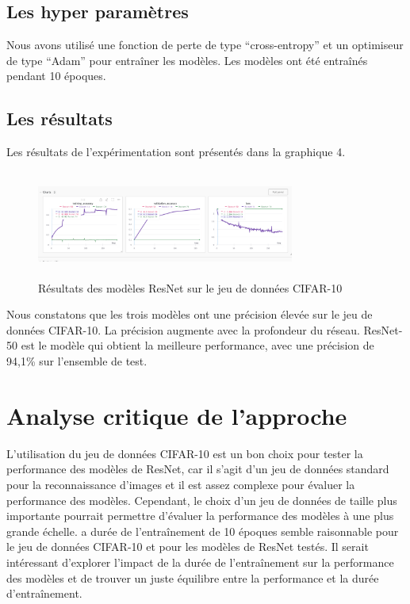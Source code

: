 \documentclass{article}
\begin{document}
\subsection{Les hyper paramètres}

Nous avons utilisé une fonction de perte de type ``cross-entropy'' et un optimiseur de type ``Adam'' pour entraîner les modèles.
Les modèles ont été entraînés pendant 10 époques.

\subsection{Les résultats}

Les résultats de l'expérimentation sont présentés dans la graphique 4.

\begin{figure}[h]
    \centering
    \includegraphics[width=240pt,height=100pt]{./img/result}
    \caption{Résultats des modèles ResNet sur le jeu de données CIFAR-10}\label{fig:result}
\end{figure}

Nous constatons que les trois modèles ont une précision élevée sur le jeu de données CIFAR-10.
La précision augmente avec la profondeur du réseau. ResNet-50 est le modèle qui obtient la meilleure performance,
avec une précision de 94,1\% sur l'ensemble de test.

\section{Analyse critique de l'approche}

L'utilisation du jeu de données CIFAR-10 est un bon choix pour tester la performance des modèles de ResNet,
car il s'agit d'un jeu de données standard pour la reconnaissance d'images et il est assez complexe pour évaluer
la performance des modèles.
Cependant, le choix d'un jeu de données de taille plus importante pourrait permettre d'évaluer la performance
des modèles à une plus grande échelle.
a durée de l'entraînement de 10 époques semble raisonnable pour le jeu de données CIFAR-10 et pour les
modèles de ResNet testés. Il serait intéressant d'explorer l'impact de la durée de l'entraînement sur la
performance des modèles et de trouver un juste équilibre entre la performance et la durée d'entraînement.
\end{document}
